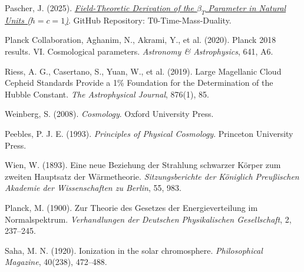 \documentclass[12pt,a4paper]{article}
\begin{document}
	\begin{thebibliography}{99}
		Pascher, J. (2025). \href{https://github.com/jpascher/T0-Time-Mass-Duality/blob/main/2/pdf/DerivationVonBetaEn.pdf}{\textit{Field-Theoretic Derivation of the $\beta_T$ Parameter in Natural Units ($\hbar = c = 1$)}}. GitHub Repository: T0-Time-Mass-Duality.
		
		Planck Collaboration, Aghanim, N., Akrami, Y., et al. (2020). Planck 2018 results. VI. Cosmological parameters. \textit{Astronomy \& Astrophysics}, 641, A6.
		
		Riess, A. G., Casertano, S., Yuan, W., et al. (2019). Large Magellanic Cloud Cepheid Standards Provide a 1\% Foundation for the Determination of the Hubble Constant. \textit{The Astrophysical Journal}, 876(1), 85.
		
		Weinberg, S. (2008). \textit{Cosmology}. Oxford University Press.
		
		Peebles, P. J. E. (1993). \textit{Principles of Physical Cosmology}. Princeton University Press.
		
		Wien, W. (1893). Eine neue Beziehung der Strahlung schwarzer Körper zum zweiten Hauptsatz der Wärmetheorie. \textit{Sitzungsberichte der Königlich Preußischen Akademie der Wissenschaften zu Berlin}, 55, 983.
		
		Planck, M. (1900). Zur Theorie des Gesetzes der Energieverteilung im Normalspektrum. \textit{Verhandlungen der Deutschen Physikalischen Gesellschaft}, 2, 237--245.
		
		Saha, M. N. (1920). Ionization in the solar chromosphere. \textit{Philosophical Magazine}, 40(238), 472--488.
	\end{thebibliography}
	
\end{document}
